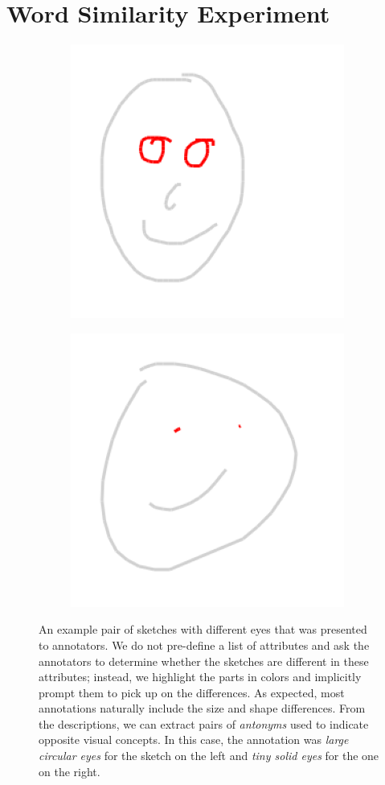 \section{Word Similarity Experiment} \label{results.cosinesim}

\begin{figure}[!htb]
\begin{subfigure}{0.5\textwidth}
    \centering
    \includegraphics[width=0.5\linewidth]{results/contrasting_pair2_color_19.png}  
\end{subfigure}
\begin{subfigure}{0.5\textwidth}
    \centering
    \includegraphics[width=0.5\linewidth]{results/contrasting_pair2_color_102.png}   
\end{subfigure}
\caption{An example pair of sketches with different eyes that was presented to annotators. We do not pre-define a list of attributes and ask the annotators to determine whether the sketches are different in these attributes; instead, we highlight the parts in colors and implicitly prompt them to pick up on the differences. As expected, most annotations naturally include the size and shape differences. From the descriptions, we can extract pairs of \textit{antonyms} used to indicate opposite visual concepts. In this case, the annotation was \textit{large circular eyes} for the sketch on the left and \textit{tiny solid eyes} for the one on the right.}
\label{results.contrasting.sketches}
\end{figure}

